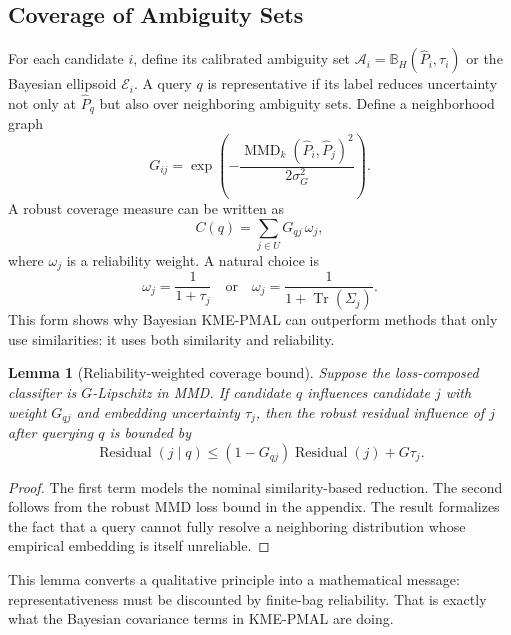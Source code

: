 \documentclass[10pt,journal]{IEEEtran}
\newtheorem{lemma}{Lemma}
\DeclareMathOperator{\MMD}{MMD}
\DeclareMathOperator{\Tr}{Tr}
\newcommand{\wh}{\widehat}
\newcommand{\ball}{\mathbb{B}}
\begin{document}
\subsection{Coverage of Ambiguity Sets}

For each candidate $i$, define its calibrated ambiguity set $\mathcal{A}_i=\ball_H(\wh P_i,\tau_i)$ or the Bayesian ellipsoid $\mathcal{E}_i$. A query $q$ is representative if its label reduces uncertainty not only at $\wh P_q$ but also over neighboring ambiguity sets. Define a neighborhood graph
\begin{equation}
    G_{ij}=\exp\left(-\frac{\MMD_k(\wh P_i,\wh P_j)^2}{2\sigma_G^2}\right).
\end{equation}
A robust coverage measure can be written as
\begin{equation}
    C(q)=\sum_{j\in U}G_{qj}\,\omega_j,
\end{equation}
where $\omega_j$ is a reliability weight. A natural choice is
\begin{equation}
    \omega_j=\frac{1}{1+\tau_j}\quad\text{or}\quad \omega_j=\frac{1}{1+\Tr(\Sigma_j)}.
\end{equation}
This form shows why Bayesian KME-PMAL can outperform methods that only use similarities: it uses both similarity and reliability.

\begin{lemma}[Reliability-weighted coverage bound]
\label{lem:coverage}
Suppose the loss-composed classifier is $G$-Lipschitz in MMD. If candidate $q$ influences candidate $j$ with weight $G_{qj}$ and embedding uncertainty $\tau_j$, then the robust residual influence of $j$ after querying $q$ is bounded by
\begin{equation}
    \operatorname{Residual}(j\mid q)\le (1-G_{qj})\operatorname{Residual}(j)+G\tau_j.
\end{equation}
\end{lemma}

\begin{proof}
The first term models the nominal similarity-based reduction. The second follows from the robust MMD loss bound in the appendix. The result formalizes the fact that a query cannot fully resolve a neighboring distribution whose empirical embedding is itself unreliable.
\end{proof}

This lemma converts a qualitative principle into a mathematical message: representativeness must be discounted by finite-bag reliability. That is exactly what the Bayesian covariance terms in KME-PMAL are doing.
\end{document}

